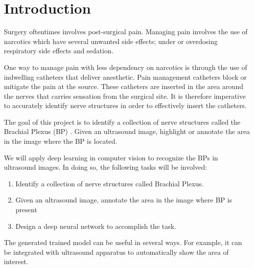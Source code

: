 \section{Introduction}
Surgery oftentimes involves post-surgical pain. Managing pain involves the use of narcotics which have several unwanted side effects; under or overdosing respiratory side effects and sedation.

One way to manage pain with less dependency on narcotics is through the use of indwelling catheters that deliver anesthetic. Pain management catheters block or mitigate the pain at the source. These catheters are inserted in the area around the nerves that carries sensation from the surgical site. It is therefore imperative to accurately identify nerve structures in order to effectively insert the catheters.

The goal of this project is to identify a collection of nerve structures called the Brachial Plexus (BP) . Given an ultrasound image, highlight or annotate the area in the image where the BP is located.

We will apply deep learning in computer vision to recognize the BPs in ultrasound images. In doing so, the following tasks will be involved:
\begin{enumerate}
  \item Identify a collection of nerve structures called Brachial Plexus.
  \item Given an ultrasound image, annotate the area in the image where BP is present
  \item Design a deep neural network to accomplish the task.
\end{enumerate}
The generated trained model can be useful in several ways. For example, it can be integrated with ultrasound apparatus to automatically show the area of interest.
